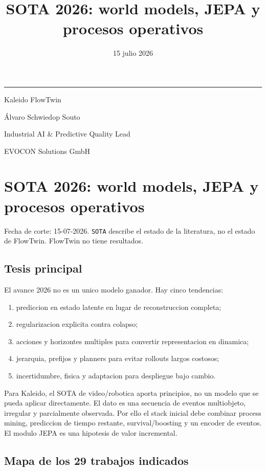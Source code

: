 \documentclass[
  spanish,
  10pt,
  a4paper,
]{article}
\title{SOTA 2026: world models, JEPA y procesos operativos}
\author{}
\date{15 julio 2026}
\makeatletter
\providecommand{\tightlist}{%
  \setlength{\itemsep}{0pt}\setlength{\parskip}{0pt}}
\renewcommand{\maketitle}{%
  \hypersetup{pageanchor=false}
  \begin{titlepage}
    \pagecolor{KaleidoNavy}
    \color{white}
    \vspace*{1.4cm}
    {\color{KaleidoCyan}\rule{2.4cm}{2.5pt}\par}
    \vspace{1.1cm}
    {\Huge\bfseries\@title\par}
    \vspace{0.65cm}
    {\Large\color{KaleidoMint}Kaleido FlowTwin\par}
    \vfill
    {\large Álvaro Schwiedop Souto\par}
    \vspace{0.15cm}
    {\normalsize\color{KaleidoMint}Industrial AI \& Predictive Quality Lead\par}
    \vspace{0.15cm}
    {\normalsize\color{KaleidoMint}EVOCON Solutions GmbH\par}
    \vspace{0.25cm}
    {\normalsize\color{KaleidoMint}\@date\par}
  \end{titlepage}
  \hypersetup{pageanchor=true}
  \nopagecolor
  \color{black}
}
\makeatother
\begin{document}
\maketitle

{
\setcounter{tocdepth}{3}
\tableofcontents
}
\section{SOTA 2026: world models, JEPA y procesos
operativos}\label{sota-2026-world-models-jepa-y-procesos-operativos}

Fecha de corte: 15-07-2026. \texttt{SOTA} describe el estado de la
literatura, no el estado de FlowTwin. FlowTwin no tiene resultados.

\subsection{Tesis principal}\label{tesis-principal}

El avance 2026 no es un unico modelo ganador. Hay cinco tendencias:

\begin{enumerate}
\def\labelenumi{\arabic{enumi}.}
\tightlist
\item
  prediccion en estado latente en lugar de reconstruccion completa;
\item
  regularizacion explicita contra colapso;
\item
  acciones y horizontes multiples para convertir representacion en
  dinamica;
\item
  jerarquia, prefijos y planners para evitar rollouts largos costosos;
\item
  incertidumbre, fisica y adaptacion para despliegue bajo cambio.
\end{enumerate}

Para Kaleido, el SOTA de video/robotica aporta principios, no un modelo
que se pueda aplicar directamente. El dato es una secuencia de eventos
multiobjeto, irregular y parcialmente observada. Por ello el stack
inicial debe combinar process mining, prediccion de tiempo restante,
survival/boosting y un encoder de eventos. El modulo JEPA es una
hipotesis de valor incremental.

\subsection{Mapa de los 29 trabajos
indicados}\label{mapa-de-los-29-trabajos-indicados}
\end{document}
